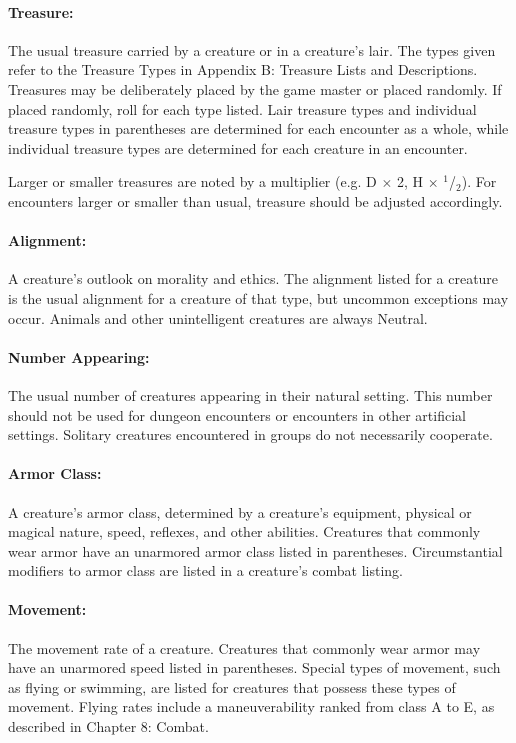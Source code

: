 \begin{multicols}{2}
\begin{minipage}{\columnwidth}
\end{minipage}

\paragraph{Treasure:} The usual treasure carried by a creature or in a creature's lair. The types given refer to the Treasure Types in Appendix B: Treasure Lists and Descriptions. Treasures may be deliberately placed by the game master or placed randomly. If placed randomly, roll for each type listed. Lair treasure types and individual treasure types in parentheses are determined for each encounter as a whole, while individual treasure types are determined for each creature in an encounter.

Larger or smaller treasures are noted by a multiplier (e.g. D $\times$ 2, H $\times$ $^1$/$_2$). For encounters larger or smaller than usual, treasure should be adjusted accordingly.

\paragraph{Alignment:} A creature's outlook on morality and ethics. The alignment listed for a creature is the usual alignment for a creature of that type, but uncommon exceptions may occur. Animals and other unintelligent creatures are always Neutral.

\paragraph{Number Appearing:} The usual number of creatures appearing in their natural setting. This number should not be used for dungeon encounters or encounters in other artificial settings. Solitary creatures encountered in groups do not necessarily cooperate.

\paragraph{Armor Class:} A creature's armor class, determined by a creature's equipment, physical or magical nature, speed, reflexes, and other abilities. Creatures that commonly wear armor have an unarmored armor class listed in parentheses. Circumstantial modifiers to armor class are listed in a creature's combat listing.

\paragraph{Movement:} The movement rate of a creature. Creatures that commonly wear armor may have an unarmored speed listed in parentheses. Special types of movement, such as flying or swimming, are listed for creatures that possess these types of movement. Flying rates include a maneuverability ranked from class A to E, as described in Chapter 8: Combat.


\end{multicols}
